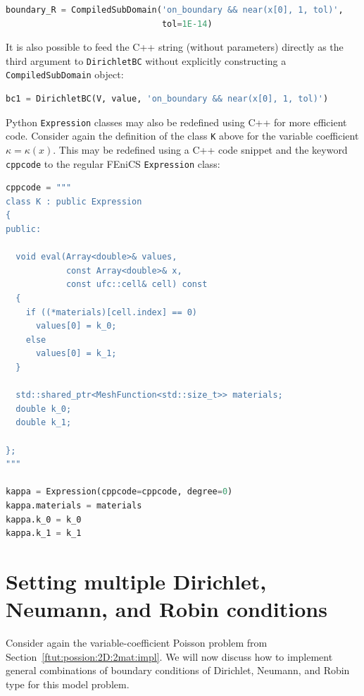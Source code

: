 \documentclass[graybox,envcountchap,sectrefs,final]{svmonodo}
\begin{document}
\begin{lstlisting}[language=Python,style=graycolor]
boundary_R = CompiledSubDomain('on_boundary && near(x[0], 1, tol)',
                               tol=1E-14)
\end{lstlisting}

It is also possible to feed the C++ string (without parameters)
directly as the third argument to \texttt{DirichletBC} without explicitly
constructing a \texttt{CompiledSubDomain} object:

\begin{lstlisting}[language=Python,style=graycolor]
bc1 = DirichletBC(V, value, 'on_boundary && near(x[0], 1, tol)')
\end{lstlisting}

Python \texttt{Expression} classes may also be redefined using C++ for more
efficient code. Consider again the definition of the class \texttt{K} above
for the variable coefficient $\kappa = \kappa(x)$. This may be redefined using a
C++ code snippet and the keyword \texttt{cppcode} to the regular FEniCS
\texttt{Expression} class:

\begin{lstlisting}[language=Python,style=graycolor]
cppcode = """
class K : public Expression
{
public:

  void eval(Array<double>& values,
            const Array<double>& x,
            const ufc::cell& cell) const
  {
    if ((*materials)[cell.index] == 0)
      values[0] = k_0;
    else
      values[0] = k_1;
  }

  std::shared_ptr<MeshFunction<std::size_t>> materials;
  double k_0;
  double k_1;

};
"""

kappa = Expression(cppcode=cppcode, degree=0)
kappa.materials = materials
kappa.k_0 = k_0
kappa.k_1 = k_1
\end{lstlisting}


\section{Setting multiple Dirichlet, Neumann, and Robin conditions}
\label{ch:poisson0:multi:bc}

Consider again the variable-coefficient Poisson problem
from Section~\ref{ftut:possion:2D:2mat:impl}. We will now discuss
how to implement general combinations of boundary conditions of
Dirichlet, Neumann, and Robin type for this model problem.
\end{document}

